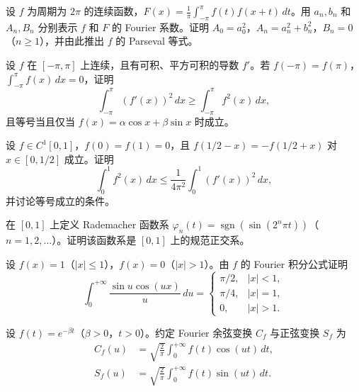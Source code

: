\noindent\begin{minipage}{\textwidth}
设 $f$ 为周期为 $2\pi$ 的连续函数，$\displaystyle F(x)=\frac1\pi\int_{-\pi}^\pi f(t)f(x+t)\,dt$。用 $a_n,b_n$ 和 $A_n,B_n$ 分别表示 $f$ 和 $F$ 的 Fourier 系数。证明 $A_0=a_0^2$，$A_n=a_n^2+b_n^2$，$B_n=0$（$n\ge1$），并由此推出 $f$ 的 Parseval 等式。
\end{minipage}\par\vfill
\noindent\begin{minipage}{\textwidth}
设 $f$ 在 $[-\pi,\pi]$ 上连续，且有可积、平方可积的导数 $f'$。若 $f(-\pi)=f(\pi)$，$\displaystyle\int_{-\pi}^\pi f(x)\,dx=0$，证明\[\int_{-\pi}^\pi(f'(x))^2\,dx\ge\int_{-\pi}^\pi f^2(x)\,dx,\]且等号当且仅当 $f(x)=\alpha\cos x+\beta\sin x$ 时成立。
\end{minipage}\par\vfill
\newpage
\noindent\begin{minipage}{\textwidth}
设 $f\in C^1[0,1]$，$f(0)=f(1)=0$，且 $f(1/2-x)=-f(1/2+x)$ 对 $x\in[0,1/2]$ 成立。证明\[\int_0^1 f^2(x)\,dx\le\frac1{4\pi^2}\int_0^1(f'(x))^2\,dx,\]并讨论等号成立的条件。
\end{minipage}\par\vfill
\noindent\begin{minipage}{\textwidth}
在 $[0,1]$ 上定义 Rademacher 函数系 $\varphi_n(t)=\operatorname{sgn}(\sin(2^n\pi t))$（$n=1,2,\ldots$）。证明该函数系是 $[0,1]$ 上的规范正交系。
\end{minipage}\par\vfill
\noindent\begin{minipage}{\textwidth}
设 $f(x)=1$（$|x|\le1$），$f(x)=0$（$|x|>1$）。由 $f$ 的 Fourier 积分公式证明\[\int_0^{+\infty}\frac{\sin u\cos(ux)}u\,du=\begin{cases}\pi/2,&|x|<1,\\\pi/4,&|x|=1,\\0,&|x|>1.\end{cases}\]
\end{minipage}\par\vfill
\newpage
\noindent\begin{minipage}{\textwidth}
设 $f(t)=e^{-\beta t}$（$\beta>0$，$t>0$）。约定 Fourier 余弦变换 $C_f$ 与正弦变换 $S_f$ 为\[\begin{aligned}C_f(u)&=\sqrt{\frac2\pi}\int_0^{+\infty}f(t)\cos(ut)\,dt,\\S_f(u)&=\sqrt{\frac2\pi}\int_0^{+\infty}f(t)\sin(ut)\,dt.\end{aligned}\]
\end{minipage}\par\vfill

